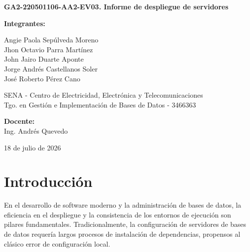 \documentclass[12pt, doc]{apa7} %
\title{} %
\author{} %
\affiliation{ %
	SENA - Centro de Electricidad, Electrónica y Telecomunicaciones \\
	Tgo. en Gestión e Implementación de Bases de Datos - 3466363 \\
	Ing. María Luz Camacho Parra \\
	17 de mayo de 2026
}
\begin{document}
	\begin{titlepage}
		\centering
		
		
		{\Large\bfseries GA2-220501106-AA2-EV03. Informe de despliegue de servidores \par} %
		
		\vspace{5.5cm} %
		
		{\large \textbf{Integrantes:} \par}
		\vspace{0.3cm}
		Angie Paola Sepúlveda Moreno \\
		Jhon Octavio Parra Martínez \\
		John Jairo Duarte Aponte \\
		Jorge Andrés Castellanos Soler \\
		José Roberto Pérez Cano \\
		
		\vfill %
		
		SENA - Centro de Electricidad, Electrónica y Telecomunicaciones \\
		Tgo. en Gestión e Implementación de Bases de Datos - 3466363 \\
		
		\vspace{1cm}
		
		\textbf{Docente:} \\
		Ing. Andrés Quevedo \\
		
		\vspace{1.5cm}
		
		18 de julio de 2026 \par
		
	\end{titlepage}
	
	\newpage
	\tableofcontents %
	\newpage
	\doublespacing
	
	\section{Introducción}
	En el desarrollo de software moderno y la administración de bases de datos, la eficiencia en el despliegue y la consistencia de los entornos de ejecución son pilares fundamentales. Tradicionalmente, la configuración de servidores de bases de datos requería largos procesos de instalación de dependencias, propensos al clásico error de configuración local. 
	
\end{document}
